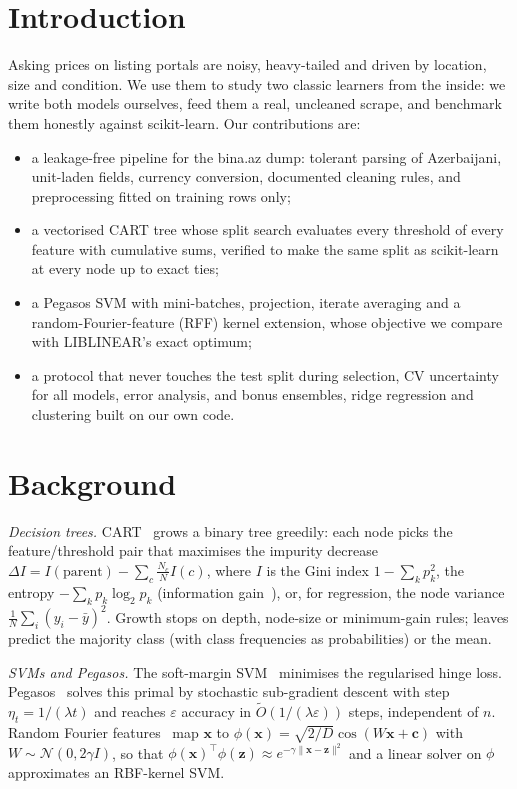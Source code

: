 \documentclass[10pt,twocolumn,a4paper]{article}
\newcommand{\vect}[1]{\mathbf{#1}}
\begin{document}
\section{Introduction}
Asking prices on listing portals are noisy, heavy-tailed and driven by
location, size and condition. We use them to study two classic learners
from the inside: we write both models ourselves, feed them a real,
uncleaned scrape, and benchmark them honestly against scikit-learn.
Our contributions are:
\begin{itemize}\setlength\itemsep{0pt}
  \item a leakage-free pipeline for the bina.az dump: tolerant parsing of
        Azerbaijani, unit-laden fields, currency conversion, documented
        cleaning rules, and preprocessing fitted on training rows only;
  \item a vectorised CART tree whose split search evaluates every
        threshold of every feature with cumulative sums, verified to make the
        same split as scikit-learn at every node up to exact ties;
  \item a Pegasos SVM with mini-batches, projection, iterate averaging and
        a random-Fourier-feature (RFF) kernel extension, whose objective we
        compare with LIBLINEAR's exact optimum;
  \item a protocol that never touches the test split during selection, CV
        uncertainty for all models, error analysis, and bonus ensembles,
        ridge regression and clustering built on our own code.
\end{itemize}

\section{Background}
\emph{Decision trees.} CART~\cite{cart} grows a binary tree greedily:
each node picks the feature/threshold pair that maximises the impurity
decrease $\Delta I = I(\text{parent})-\sum_{c}\frac{N_c}{N}I(c)$, where
$I$ is the Gini index $1-\sum_k p_k^2$, the entropy $-\sum_k p_k\log_2 p_k$
(information gain~\cite{quinlan}), or, for regression, the node variance
$\frac{1}{N}\sum_i (y_i-\bar y)^2$. Growth stops on depth, node-size or
minimum-gain rules; leaves predict the majority class (with class
frequencies as probabilities) or the mean.

\emph{SVMs and Pegasos.} The soft-margin SVM~\cite{cortes} minimises the
regularised hinge loss. Pegasos~\cite{pegasos} solves this primal by
stochastic sub-gradient descent with step $\eta_t=1/(\lambda t)$ and
reaches $\varepsilon$ accuracy in $\tilde O(1/(\lambda\varepsilon))$
steps, independent of $n$. Random Fourier features~\cite{rahimi} map
$\vect{x}$ to $\phi(\vect{x})=\sqrt{2/D}\cos(W\vect{x}+\vect{c})$ with
$W\sim\mathcal N(0,2\gamma I)$, so that
$\phi(\vect{x})^{\top}\phi(\vect{z})\approx e^{-\gamma\lVert\vect{x}-\vect{z}\rVert^2}$
and a linear solver on $\phi$ approximates an RBF-kernel SVM.
\end{document}
